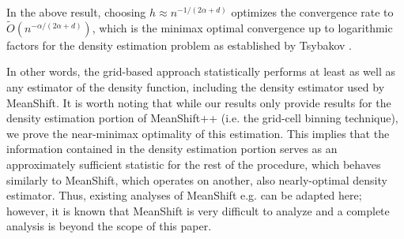 \begin{remark}
In the above result, choosing $h \approx n^{-1/(2\alpha+d)}$ optimizes the convergence rate to $\tilde{O}(n^{-\alpha/(2\alpha+d)})$, which is the minimax optimal convergence up to logarithmic factors for the density estimation problem as established by Tsybakov \cite{tsybakov1997nonparametric,tsybakov2008introduction}.
\end{remark}
In other words, the grid-based approach statistically performs at least as well as any estimator of the density function, including the density estimator used by MeanShift. It is worth noting that while our results only provide results for the density estimation portion of MeanShift++ (i.e. the grid-cell binning technique), we prove the near-minimax optimality of this estimation. This implies that the information contained in the density estimation portion serves as an approximately sufficient statistic for the rest of the procedure, which behaves similarly to MeanShift, which operates on another, also nearly-optimal density estimator. Thus, existing analyses of MeanShift e.g. \cite{arias2016estimation,chen2015convergence,xiang2005convergence,li2007note,ghassabeh2015sufficient,ghassabeh2013convergence,subbarao2009nonlinear} can be adapted here; however, it is known that MeanShift is very difficult to analyze \cite{dasgupta2014optimal} and a complete analysis is beyond the scope of this paper.
